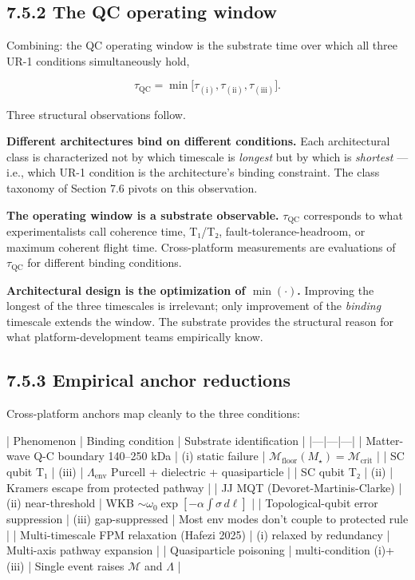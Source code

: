 \documentclass[11pt]{book}
\begin{document}
\subsection{7.5.2 The QC operating window}

Combining: the QC operating window is the substrate time over which all three UR-1 conditions simultaneously hold,

\[
\tau_\mathrm{QC} = \min\bigl[\tau_{(\mathrm{i})}, \tau_{(\mathrm{ii})}, \tau_{(\mathrm{iii})}\bigr].
\]

Three structural observations follow.

\textbf{Different architectures bind on different conditions.} Each architectural class is characterized not by which timescale is \textit{longest} but by which is \textit{shortest} — i.e., which UR-1 condition is the architecture's binding constraint. The class taxonomy of Section 7.6 pivots on this observation.

\textbf{The operating window is a substrate observable.} $\tau_\mathrm{QC}$ corresponds to what experimentalists call coherence time, T₁/T₂, fault-tolerance-headroom, or maximum coherent flight time. Cross-platform measurements are evaluations of $\tau_\mathrm{QC}$ for different binding conditions.

\textbf{Architectural design is the optimization of $\min(\cdot)$.} Improving the longest of the three timescales is irrelevant; only improvement of the \textit{binding} timescale extends the window. The substrate provides the structural reason for what platform-development teams empirically know.

\subsection{7.5.3 Empirical anchor reductions}

Cross-platform anchors map cleanly to the three conditions:

| Phenomenon | Binding condition | Substrate identification |
|---|---|---|
| Matter-wave Q-C boundary 140–250 kDa | (i) static failure | $\mathcal{M}_\mathrm{floor}(M_\star) = \mathcal{M}_\mathrm{crit}$ |
| SC qubit T₁ | (iii) | $\Lambda_\mathrm{env}$ Purcell + dielectric + quasiparticle |
| SC qubit T₂ | (ii) | Kramers escape from protected pathway |
| JJ MQT (Devoret-Martinis-Clarke) | (ii) near-threshold | WKB $\sim \omega_0 \exp[-\alpha\int\sigma\,d\ell]$ |
| Topological-qubit error suppression | (iii) gap-suppressed | Most env modes don't couple to protected rule |
| Multi-timescale FPM relaxation (Hafezi 2025) | (i) relaxed by redundancy | Multi-axis pathway expansion |
| Quasiparticle poisoning | multi-condition (i)+(iii) | Single event raises $\mathcal{M}$ and $\Lambda$ |
\end{document}
